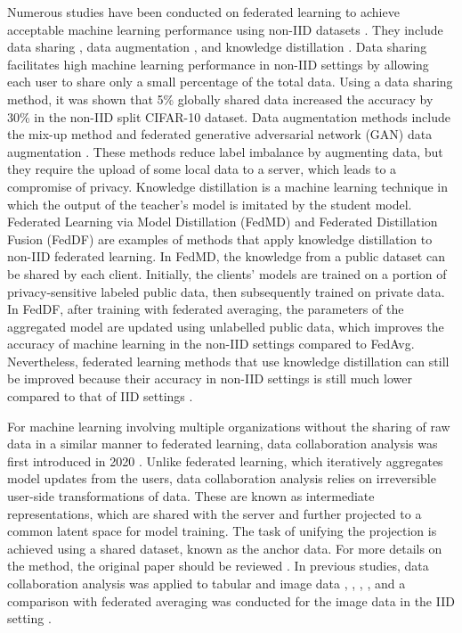 \documentclass{article}
\begin{document}
Numerous studies have been conducted on federated learning to achieve acceptable machine learning performance using non-IID datasets \cite{zhu2021federated}. They include data sharing \cite{zhao2018federated}, data augmentation \cite{tanner1987calculation}, and knowledge distillation \cite{hinton2015distilling}. Data sharing facilitates high machine learning performance in non-IID settings by allowing each user to share only a small percentage of the total data. Using a data sharing method, it was shown that 5\% globally shared data increased the accuracy by 30\% in the non-IID split CIFAR-10 dataset. Data augmentation methods include the mix-up method \cite{yoon2021fedmix} and federated generative adversarial network (GAN) data augmentation \cite{li2022federated}. These methods reduce label imbalance by augmenting data, but they require the upload of some local data to a server, which leads to a compromise of privacy. Knowledge distillation is a machine learning technique in which the output of the teacher's model is imitated by the student model. Federated Learning
via Model Distillation (FedMD) \cite{li2019fedmd} and Federated Distillation Fusion (FedDF) \cite{lin2020ensemble} are examples of methods that apply knowledge distillation to non-IID federated learning. In FedMD, the knowledge from a public dataset can be shared by each client. Initially, the clients' models are trained on a portion of privacy-sensitive labeled public data, then subsequently trained on private data. In FedDF, after training with federated averaging, the parameters of the aggregated model are updated using unlabelled public data, which improves the accuracy of machine learning in the non-IID settings compared to FedAvg. Nevertheless, federated learning methods that use knowledge distillation can still be improved because their accuracy in non-IID settings is still much lower compared to that of IID settings \cite{lin2020ensemble}.

For machine learning involving multiple organizations without the sharing of raw data in a similar manner to federated learning, data collaboration analysis was first introduced in 2020 \cite{imakura2020data}. Unlike federated learning, which iteratively aggregates model updates from the users, data collaboration analysis relies on irreversible user-side transformations of data. These are known as intermediate representations, which are shared with the server and further projected to a common latent space for model training. The task of unifying the projection is achieved using a shared dataset, known as the anchor data. For more details on the method, the original paper should be reviewed \cite{imakura2020data}. In previous studies, data collaboration analysis was applied to tabular and image data \cite{imakura2021collaborative}, \cite{imakura2021interpretable}, \cite{imakura2022dc}, \cite{imakura2023non}, and a comparison with federated averaging was conducted for the image data in the IID setting \cite{bogdanova2020federated}. 
\end{document}
